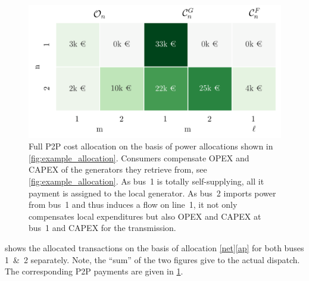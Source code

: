 \documentclass[11pt,twocolumn]{article}
\begin{document}
% 
\begin{figure}[h]
    \centering
    \includegraphics[width=\linewidth]{example_payoff_net_ebe.png}
    \caption{Full P2P cost allocation on the basis of power allocations shown in \cref{fig:example_allocation}. Consumers compensate OPEX and CAPEX of the generators they retrieve from, see \cref{fig:example_allocation}. As bus~1 is totally self-supplying, all it payment is assigned to the local generator.  As bus~2 imports power from bus~1 and thus induces a flow on line~1, it not only compensates local expenditures but also OPEX and CAPEX at bus~1 and CAPEX for the transmission.}
    \label{fig:example_payoff}
\end{figure}    
% 
% 
% 
 shows the allocated transactions on the basis of allocation \ref{net}\ref{ap} for both buses 1~\&~2 separately. Note, the ``sum'' of the two figures give to the actual dispatch. The corresponding P2P payments are given in \cref{fig:example_payoff}.  
\end{document}
